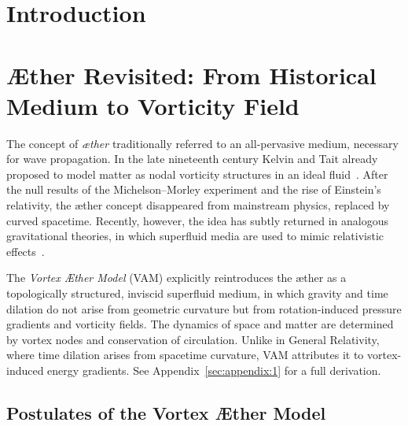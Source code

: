\documentclass[preprint]{revtex4-2}
\begin{document}
\newpage
\tableofcontents
\newpage

\section*{Introduction}
\section*{Æther Revisited: From Historical Medium to Vorticity Field}

The concept of \textit{æther} traditionally referred to an all-pervasive medium, necessary for wave propagation. In the late nineteenth century Kelvin and Tait already proposed to model matter as nodal vorticity structures in an ideal fluid~\cite{thomson1867treatise}. After the null results of the Michelson--Morley experiment and the rise of Einstein's relativity, the æther concept disappeared from mainstream physics, replaced by curved spacetime. Recently, however, the idea has subtly returned in analogous gravitational theories, in which superfluid media are used to mimic relativistic effects~\cite{barcelo2011analogue, volovik2009universe}.

The \textit{Vortex Æther Model} (VAM) explicitly reintroduces the æther as a topologically structured, inviscid superfluid medium, in which gravity and time dilation do not arise from geometric curvature but from rotation-induced pressure gradients and vorticity fields. The dynamics of space and matter are determined by vortex nodes and conservation of circulation. Unlike in General Relativity, where time dilation arises from spacetime curvature, VAM attributes it to vortex-induced energy gradients. See Appendix~\ref{sec:appendix:1} for a full derivation.


\subsection*{Postulates of the Vortex Æther Model}
\end{document}
